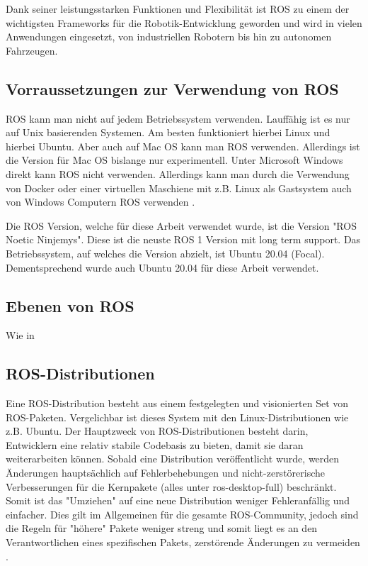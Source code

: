 Dank seiner leistungsstarken Funktionen und Flexibilität ist \ac{ROS} zu einem der wichtigsten Frameworks für die Robotik-Entwicklung geworden und wird in vielen Anwendungen eingesetzt, von industriellen Robotern bis hin zu autonomen Fahrzeugen.

    \subsection{Vorraussetzungen zur Verwendung von ROS} \label{Vorraussetzungen zur Verwendung von ROS:subsection}
    \ac{ROS} kann man nicht auf jedem Betriebssystem verwenden. Lauffähig ist es nur auf Unix basierenden Systemen. Am besten funktioniert hierbei Linux und hierbei Ubuntu. Aber auch auf Mac OS kann man ROS verwenden. Allerdings ist die Version für Mac OS bislange nur experimentell. Unter Microsoft Windows direkt kann \ac{ROS} nicht verwenden. Allerdings kann man durch die Verwendung von Docker oder einer virtuellen Maschiene mit z.B. Linux als Gastsystem auch von Windows Computern \ac{ROS} verwenden \cite[vgl.][]{ROSIntroduction}.

    Die \ac{ROS} Version, welche für diese Arbeit verwendet wurde, ist die Version "ROS Noetic Ninjemys". Diese ist die neuste ROS 1 Version mit long term support. Das Betriebssystem, auf welches die Version abzielt, ist Ubuntu 20.04 (Focal). Dementsprechend wurde auch Ubuntu 20.04 für diese Arbeit verwendet.

    \subsection{Ebenen von ROS} \label{Ebenen von ROS:subsection}
    Wie in \cite{ROSconcepts}

    \subsection{ROS-Distributionen} \label{ROS-Distributionen:subsection}
    Eine ROS-Distribution besteht aus einem festgelegten und visionierten Set von ROS-Paketen. Vergelichbar ist dieses System mit den Linux-Distributionen wie z.B. Ubuntu. Der Hauptzweck von ROS-Distributionen besteht darin, Entwicklern eine relativ stabile Codebasis zu bieten, damit sie daran weiterarbeiten können. Sobald eine Distribution veröffentlicht wurde, werden Änderungen hauptsächlich auf Fehlerbehebungen und nicht-zerstörerische Verbesserungen für die Kernpakete (alles unter ros-desktop-full) beschränkt. Somit ist das "Umziehen" auf eine neue Distribution weniger Fehleranfällig und einfacher. Dies gilt im Allgemeinen für die gesamte ROS-Community, jedoch sind die Regeln für "höhere" Pakete weniger streng und somit liegt es an den Verantwortlichen eines spezifischen Pakets, zerstörende Änderungen zu vermeiden \cite[vgl.][]{ROScontributions}.

